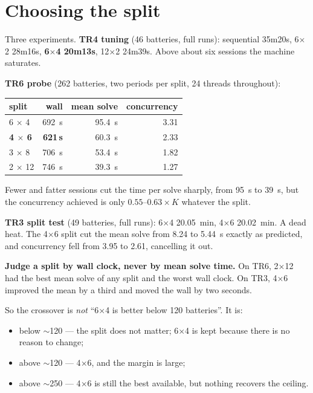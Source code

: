 \documentclass[11pt,a4paper]{article}
\newcommand{\gd}[1]{\textcolor{good}{#1}}
\begin{document}
\section{Choosing the split}

Three experiments. \textbf{TR4 tuning} (46 batteries, full runs): sequential
35m20s, 6$\times$2 28m16s, \textbf{6$\times$4 20m13s}, 12$\times$2 24m39s. Above
about six sessions the machine saturates.

\textbf{TR6 probe} (262 batteries, two periods per split, 24 threads throughout):

\begin{center}
\begin{tabular}{@{}l r r r@{}}
\toprule
\textbf{split} & \textbf{wall} & \textbf{mean solve} & \textbf{concurrency} \\
\midrule
6 $\times$ 4 & \SI{692}{\second} & \SI{95.4}{\second} & 3.31 \\
\textbf{4 $\times$ 6} & \gd{\textbf{621\,s}} & \SI{60.3}{\second} & 2.33 \\
3 $\times$ 8 & \SI{706}{\second} & \SI{53.4}{\second} & 1.82 \\
2 $\times$ 12 & \SI{746}{\second} & \SI{39.3}{\second} & 1.27 \\
\bottomrule
\end{tabular}
\end{center}

Fewer and fatter sessions cut the time per solve sharply, from \SI{95}{\second}
to \SI{39}{\second}, but the concurrency achieved is only $0.55$--$0.63 \times K$
whatever the split.

\textbf{TR3 split test} (49 batteries, full runs): 6$\times$4
\SI{20.05}{\minute}, 4$\times$6 \SI{20.02}{\minute}. A dead heat. The 4$\times$6
split cut the mean solve from 8.24 to \SI{5.44}{\second} exactly as predicted,
and concurrency fell from 3.95 to 2.61, cancelling it out.

\begin{keybox}
\textbf{Judge a split by wall clock, never by mean solve time.} On TR6,
2$\times$12 had the best mean solve of any split and the worst wall clock. On
TR3, 4$\times$6 improved the mean by a third and moved the wall by two seconds.
\end{keybox}

So the crossover is \emph{not} ``6$\times$4 is better below 120 batteries''. It is:

\begin{itemize}
  \item below $\sim$120 --- the split does not matter; 6$\times$4 is kept because
        there is no reason to change;
  \item above $\sim$120 --- 4$\times$6, and the margin is large;
  \item above $\sim$250 --- 4$\times$6 is still the best available, but nothing
        recovers the ceiling.
\end{itemize}
\end{document}
